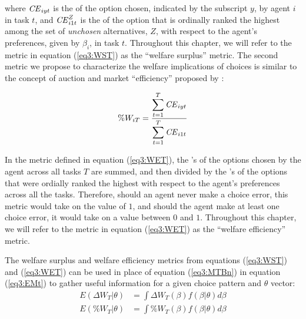 \documentclass[../main.tex]{subfiles}
\begin{document}
\noindent where ${\mathit{CE}}_{iyt}$ is the {\CE} of the option chosen, indicated by the subscript $y$, by agent $i$ in task $t$, and ${\mathit{CE}}_{i1t}^Z$ is the {\CE} of the option that is ordinally ranked the highest among the set of \textit{unchosen} alternatives, $Z$, with respect to the agent's preferences, given by $\beta_i$, in task $t$.
Throughout this chapter, we will refer to the metric in equation (\ref{eq3:WST}) as the \enquote{welfare surplus} metric.
The second metric we propose to characterize the welfare implications of choices is similar to the concept of auction and market \enquote{efficiency} proposed by \textcite{Plott1978}:

\begin{equation}
	\label{eq3:WET}
	\%W_{iT} = \frac{\displaystyle\sum_{t=1}^{T} {\mathit{CE}}_{iyt} }{\displaystyle\sum_{t=1}^{T} {\mathit{CE}}_{i1t}}
\end{equation}

\noindent In the metric defined in equation (\ref{eq3:WET}), the {\CE}'s of the options chosen by the agent across all tasks $T$ are summed, and then divided by the {\CE}'s of the options that were ordially ranked the highest with respect to the agent's preferences across all the tasks.
Therefore, should an agent never make a choice error, this metric would take on the value of $1$, and should the agent make at least one choice error, it would take on a value between $0$ and $1$.{\footnotemark}
Throughout this chapter, we will refer to the metric in equation (\ref{eq3:WET}) as the \enquote{welfare efficiency} metric.

\addtocounter{footnote}{-1}

The welfare surplus and welfare efficiency metrics from equations (\ref{eq3:WST}) and (\ref{eq3:WET}) can be used in place of equation (\ref{eq3:MTBn}) in equation (\ref{eq3:EMt}) to gather useful information for a given choice pattern and $\theta$ vector:
\begin{align}
	E( \Delta W_T | \theta) &= \int \Delta W_T(\beta) f(\beta | \theta) d \beta \label{eq3:EWST}\\
	E( \% W_T | \theta) &= \int \% W_T(\beta) f(\beta | \theta) d \beta \label{eq3:EWET}
\end{align}
\end{document}
